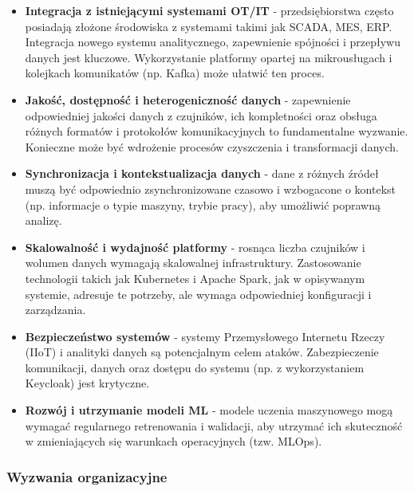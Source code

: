 \begin{itemize}
    \item \textbf{Integracja z istniejącymi systemami OT/IT} - przedsiębiorstwa często posiadają złożone środowiska z systemami takimi jak SCADA, MES, ERP. Integracja nowego systemu analitycznego, zapewnienie spójności i przepływu danych jest kluczowe. Wykorzystanie platformy opartej na mikrousługach i kolejkach komunikatów (np. Kafka) może ułatwić ten proces.
    \item \textbf{Jakość, dostępność i heterogeniczność danych} - zapewnienie odpowiedniej jakości danych z czujników, ich kompletności oraz obsługa różnych formatów i protokołów komunikacyjnych to fundamentalne wyzwanie. Konieczne może być wdrożenie procesów czyszczenia i transformacji danych.
    \item \textbf{Synchronizacja i kontekstualizacja danych} - dane z różnych źródeł muszą być odpowiednio zsynchronizowane czasowo i wzbogacone o kontekst (np. informacje o typie maszyny, trybie pracy), aby umożliwić poprawną analizę.
    \item \textbf{Skalowalność i wydajność platformy} - rosnąca liczba czujników i wolumen danych wymagają skalowalnej infrastruktury. Zastosowanie technologii takich jak Kubernetes i Apache Spark, jak w opisywanym systemie, adresuje te potrzeby, ale wymaga odpowiedniej konfiguracji i zarządzania.
    \item \textbf{Bezpieczeństwo systemów} - systemy Przemysłowego Internetu Rzeczy (IIoT) i analityki danych są potencjalnym celem ataków. Zabezpieczenie komunikacji, danych oraz dostępu do systemu (np. z wykorzystaniem Keycloak) jest krytyczne.
    \item \textbf{Rozwój i utrzymanie modeli ML} - modele uczenia maszynowego mogą wymagać regularnego retrenowania i walidacji, aby utrzymać ich skuteczność w zmieniających się warunkach operacyjnych (tzw. MLOps).
\end{itemize}

\subsubsection{Wyzwania organizacyjne}
\label{subsubsec:wyzwania_organizacyjne}

